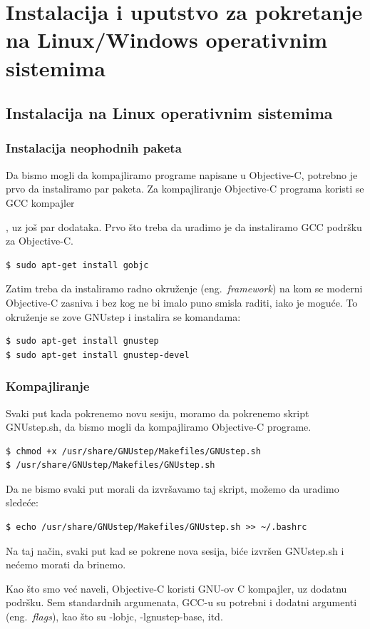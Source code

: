 \documentclass[a4paper]{article}
\begin{document}
{\section{Instalacija i uputstvo za pokretanje na Linux/Windows operativnim sistemima}
\label{sec:instalacija}
\subsection{Instalacija na Linux operativnim sistemima}
\subsubsection{Instalacija neophodnih paketa}
Da bismo mogli da kompajliramo programe napisane u Objective-C, potrebno je prvo da instaliramo
par paketa. Za kompajliranje Objective-C programa koristi se GCC kompajler{\cite{gcc}, uz još par
dodataka.
Prvo što treba da uradimo je da instaliramo GCC podršku za Objective-C.

\begin{lstlisting}[frame=single]
$ sudo apt-get install gobjc
\end{lstlisting}
Zatim treba da instaliramo radno okruženje (eng.~{\em framework}) na kom se moderni Objective-C zasniva i bez kog ne bi imalo puno smisla raditi, iako je moguće.
To okruženje se zove GNUstep \cite{gnustep} i instalira se komandama:
\begin{lstlisting}[frame=single]
$ sudo apt-get install gnustep
$ sudo apt-get install gnustep-devel
\end{lstlisting}
\subsubsection{Kompajliranje}
Svaki put kada pokrenemo novu sesiju, moramo da pokrenemo skript GNUstep.sh, da bismo mogli da kompajliramo Objective-C programe.
\begin{lstlisting}[frame=single]
$ chmod +x /usr/share/GNUstep/Makefiles/GNUstep.sh
$ /usr/share/GNUstep/Makefiles/GNUstep.sh
\end{lstlisting}
Da ne bismo svaki put morali da izvršavamo taj skript, možemo da uradimo sledeće:
\begin{lstlisting}[frame=single]
$ echo /usr/share/GNUstep/Makefiles/GNUstep.sh >> ~/.bashrc
\end{lstlisting}

Na taj način, svaki put kad se pokrene nova sesija, biće izvršen GNUstep.sh i nećemo morati da brinemo.

Kao što smo već naveli, Objective-C koristi GNU-ov C kompajler, uz dodatnu
podršku.
Sem standardnih argumenata, GCC-u su potrebni i dodatni argumenti (eng.~{\em flags}), kao što su -lobjc, -lgnustep-base, itd.

}}
\end{document}
